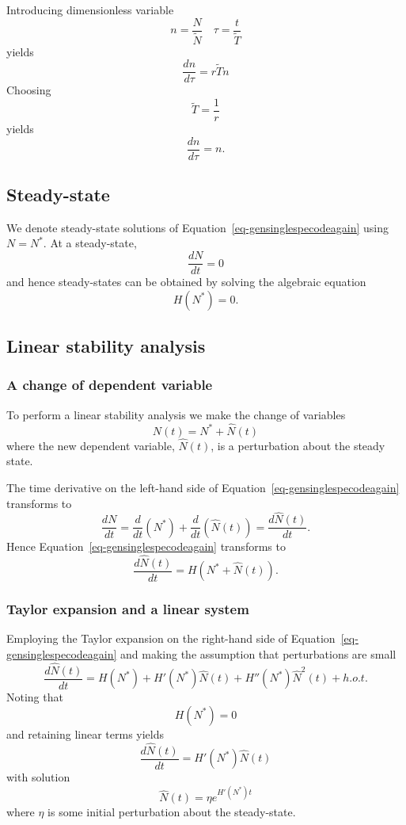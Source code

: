 \documentclass[
  letterpaper,
  DIV=11,
  numbers=noendperiod]{scrreprt}
\begin{document}
Introducing dimensionless variable \[
n=\frac{N}{\tilde{N}} \quad \tau=\frac{t}{\tilde{T}}
\] yields \[
\frac{dn}{d\tau}=r\tilde{T}n
\] Choosing \[
\tilde{T}=\frac{1}{r} 
\] yields \[
\frac{dn}{d\tau}=n.
\]

\hypertarget{steady-state}{%
\subsection{Steady-state}\label{steady-state}}

We denote steady-state solutions of
Equation~\ref{eq-gensinglespecodeagain} using \(N=N^*\). At a
steady-state, \[
\frac{dN}{dt}=0
\] and hence steady-states can be obtained by solving the algebraic
equation \[
H(N^*)=0.
\]

\hypertarget{linear-stability-analysis-2}{%
\subsection{Linear stability
analysis}\label{linear-stability-analysis-2}}

\hypertarget{a-change-of-dependent-variable}{%
\subsubsection{A change of dependent
variable}\label{a-change-of-dependent-variable}}

To perform a linear stability analysis we make the change of variables
\[
N(t)=N^*+\hat{N}(t)
\] where the new dependent variable, \(\hat{N}(t)\), is a perturbation
about the steady state.

The time derivative on the left-hand side of
Equation~\ref{eq-gensinglespecodeagain} transforms to \[
\frac{dN}{dt}= \frac{d }{dt} (N^*) + \frac{d }{dt}(\hat{N}(t))=\frac{d\hat{N}(t) }{dt}.
\] Hence Equation~\ref{eq-gensinglespecodeagain} transforms to \[
\frac{d\hat{N}(t) }{dt} = H(N^*+\hat{N}(t)).
\]

\hypertarget{taylor-expansion-and-a-linear-system}{%
\subsubsection{Taylor expansion and a linear
system}\label{taylor-expansion-and-a-linear-system}}

Employing the Taylor expansion on the right-hand side of
Equation~\ref{eq-gensinglespecodeagain} and making the assumption that
perturbations are small \[
\frac{d\hat{N}(t) }{dt} = H(N^*)+  H'(N^*)\hat{N}(t) + H''(N^*)\hat{N}^2(t) + h.o.t.
\] Noting that\\
\[
H(N^*)=0
\] and retaining linear terms yields \[
\frac{d\hat{N}(t) }{dt} =  H'(N^*)\hat{N}(t)
\] with solution \[
\hat{N}(t)=  \eta e^{H'(N^*) t}
\] where \(\eta\) is some initial perturbation about the steady-state.
\end{document}
